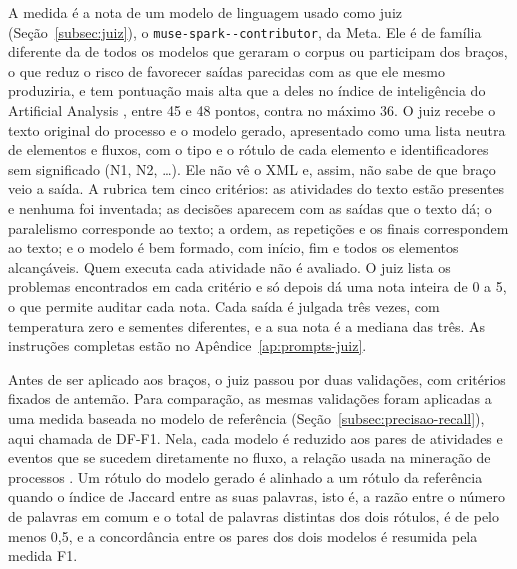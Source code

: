 A medida é a nota de um modelo de linguagem usado como juiz (Seção~\ref{subsec:juiz}), o \texttt{muse-\allowbreak spark--\allowbreak contributor}, da Meta. Ele é de família diferente da de todos os modelos que geraram o corpus ou participam dos braços, o que reduz o risco de favorecer saídas parecidas com as que ele mesmo produziria, e tem pontuação mais alta que a deles no índice de inteligência do Artificial Analysis \cite{artificialanalysis2026}, entre 45 e 48 pontos, contra no máximo 36. O juiz recebe o texto original do processo e o modelo gerado, apresentado como uma lista neutra de elementos e fluxos, com o tipo e o rótulo de cada elemento e identificadores sem significado (N1, N2, \ldots). Ele não vê o XML e, assim, não sabe de que braço veio a saída. A rubrica tem cinco critérios: as atividades do texto estão presentes e nenhuma foi inventada; as decisões aparecem com as saídas que o texto dá; o paralelismo corresponde ao texto; a ordem, as repetições e os finais correspondem ao texto; e o modelo é bem formado, com início, fim e todos os elementos alcançáveis. Quem executa cada atividade não é avaliado. O juiz lista os problemas encontrados em cada critério e só depois dá uma nota inteira de 0 a 5, o que permite auditar cada nota. Cada saída é julgada três vezes, com temperatura zero e sementes diferentes, e a sua nota é a mediana das três. As instruções completas estão no Apêndice~\ref{ap:prompts-juiz}.

Antes de ser aplicado aos braços, o juiz passou por duas validações, com critérios fixados de antemão. Para comparação, as mesmas validações foram aplicadas a uma medida baseada no modelo de referência (Seção~\ref{subsec:precisao-recall}), aqui chamada de DF-F1. Nela, cada modelo é reduzido aos pares de atividades e eventos que se sucedem diretamente no fluxo, a relação usada na mineração de processos \cite{vanderaalst2016processmining}. Um rótulo do modelo gerado é alinhado a um rótulo da referência quando o índice de Jaccard entre as suas palavras, isto é, a razão entre o número de palavras em comum e o total de palavras distintas dos dois rótulos, é de pelo menos 0,5, e a concordância entre os pares dos dois modelos é resumida pela medida F1.

